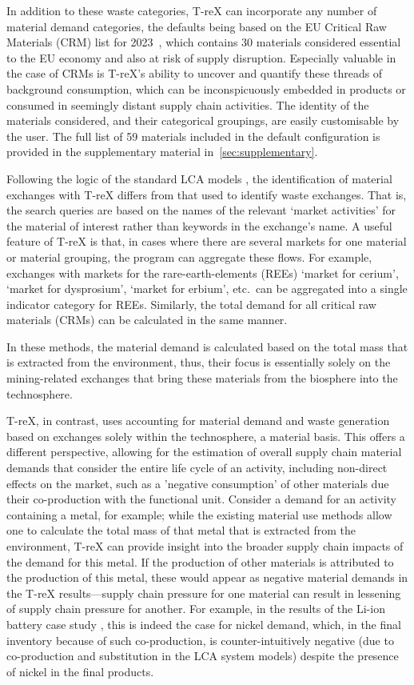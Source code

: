 \documentclass[a4paper,fleqn,longmktitle]{cas-dc}
\begin{document}
In addition to these waste categories, T-reX can incorporate any number of material demand categories, the defaults being based on the EU Critical Raw Materials (CRM) list for 2023~\citep{eu2023crmstudy}, which contains 30 materials considered essential to the EU economy and also at risk of supply disruption. Especially valuable in the case of CRMs is T-reX's ability to uncover and quantify these threads of background consumption, which can be inconspicuously embedded in products or consumed in seemingly distant supply chain activities. The identity of the materials considered, and their categorical groupings, are easily customisable by the user. The full list of 59 materials included in the default configuration is provided in the supplementary material in~\autoref{sec:supplementary}.

Following the logic of the standard LCA models \cite{ecoinvent2016version3, guinee2004economicallocation}, the identification of material exchanges with T-reX differs from that used to identify waste exchanges. That is, the search queries are based on the names of the relevant `market activities' for the material of interest rather than keywords in the exchange's name. A useful feature of T-reX is that, in cases where there are several markets for one material or material grouping, the program can aggregate these flows. For example, exchanges with markets for the rare-earth-elements (REEs) `market for cerium', `market for dysprosium', `market for erbium', etc.\ can be aggregated into a single indicator category for REEs. Similarly, the total demand for all critical raw materials (CRMs) can be calculated in the same manner.

In these methods, the material demand is calculated based on the total mass that is extracted from the environment, thus, their focus is essentially solely on the mining-related exchanges that bring these materials from the biosphere into the technosphere.

T-reX, in contrast, uses accounting for material demand and waste generation based on exchanges solely within the technosphere, a material basis. This offers a different perspective, allowing for the estimation of overall supply chain material demands that consider the entire life cycle of an activity, including non-direct effects on the market, such as a 'negative consumption' of other materials due their co-production with the functional unit. Consider a demand for an activity containing a metal, for example; while the existing material use methods allow one to calculate the total mass of that metal that is extracted from the environment, T-reX can provide insight into the broader supply chain impacts of the demand for this metal. If the production of other materials is attributed to the production of this metal, these would appear as negative material demands in the T-reX results---supply chain pressure for one material can result in lessening of supply chain pressure for another. For example, in the results of the Li-ion battery case study , this is indeed the case for nickel demand, which, in the final inventory because of such co-production, is counter-intuitively negative (due to co-production and substitution in the LCA system models) despite the presence of nickel in the final products.
\end{document}
